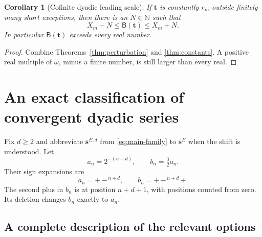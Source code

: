 \documentclass[11pt,letterpaper]{article}
\newtheorem{corollary}[theorem]{Corollary}
\theoremstyle{definition}
\theoremstyle{remark}
\newcommand{\NN}{\mathbb N}
\newcommand{\BB}{\mathsf B}
\newcommand{\bs}{\boldsymbol{s}}
\newcommand{\bt}{\boldsymbol{t}}
\newcommand{\signplus}{\mathtt{+}}
\newcommand{\signminus}{\mathtt{-}}
\begin{document}
\begin{corollary}[Cofinite dyadic leading scale]\label{cor:dyadic-tail}
If $\bt$ is constantly $r_m$ outside finitely many short exceptions, then there
is an $N\in\NN$ such that
\begin{equation}\label{eq:tail-bound}
                              X_m-N\leq\BB(\bt)\leq X_m+N.
\end{equation}
In particular $\BB(\bt)$ exceeds every real number.
\end{corollary}
\begin{proof}
Combine Theorems~\ref{thm:perturbation} and \ref{thm:constants}. A positive real
multiple of $\omega$, minus a finite number, is still larger than every real.
\end{proof}

\section{An exact classification of convergent dyadic series}\label{sec:classification}

Fix $d\geq2$ and abbreviate $\bs^{E,d}$ from \eqref{eq:main-family} to $\bs^E$
when the shift is understood. Let
\[
                        a_n=2^{-(n+d)},\qquad b_n=\tfrac32a_n.
\]
Their sign expansions are
\begin{equation}\label{eq:ab-signs}
 a_n=\signplus\,\signminus^{\,n+d},\qquad
 b_n=\signplus\,\signminus^{\,n+d}\,\signplus.
\end{equation}
The second plus in $b_n$ is at position $n+d+1$, with positions counted from
zero. Its deletion changes $b_n$ exactly to $a_n$.

\subsection{A complete description of the relevant options}
\end{document}
